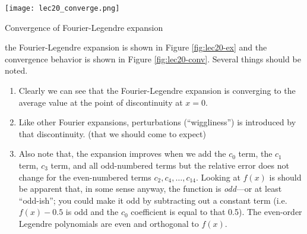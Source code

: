 \begin{marginfigure}
\texttt{[image: lec20\_converge.png]}
\caption{Convergence of Fourier-Legendre expansion}
\label{fig:lec20-conv}
\end{marginfigure}
 the Fourier-Legendre expansion is shown in Figure \ref{fig:lec20-ex} and the convergence behavior is shown in Figure \ref{fig:lec20-conv}.  Several things should be noted.
\begin{enumerate}
\item Clearly we can see that the Fourier-Legendre expansion is converging to the average value at the point of discontinuity at $x=0$.  
\item Like other Fourier expansions, perturbations (``wiggliness'') is introduced by that discontinuity. (that we should come to expect)
\item Also note that, the expansion improves when we add the $c_0$ term, the $c_1$ term, $c_3$ term, and all odd-numbered terms but the relative error does not change for the even-numbered terms $c_2,c_4,\dots,c_{14}$.  Looking at $f(x)$ is should be apparent that, in some sense anyway, the function is \emph{odd}---or at least ``odd-ish''; you could make it odd by subtracting out a constant term (i.e. $f(x) - 0.5$ is odd and the $c_0$ coefficient is equal to that 0.5).  The even-order Legendre polynomials are even and orthogonal to $f(x)$.  
\end{enumerate}

